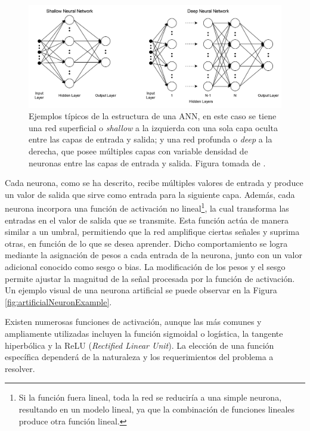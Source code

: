 \begin{figure}[h]
    \centering
    \includegraphics[width=\linewidth]{figures/2_theory/neuralNetDiagram.png}
    \caption[Ejemplos de la estructura de una ANN]{Ejemplos típicos de la estructura de una ANN, en este caso se tiene una red superficial o \textit{shallow} a la izquierda con una sola capa oculta entre las capas de entrada y salida; y una red profunda o \textit{deep} a la derecha, que posee múltiples capas con variable densidad de neuronas entre las capas de entrada y salida. Figura tomada de \cite{annPictureSource}.}
    \label{fig:annExample}
\end{figure}

Cada neurona, como se ha descrito, recibe múltiples valores de entrada y produce un valor de salida que sirve como entrada para la siguiente capa. Además, cada neurona incorpora una función de activación no lineal\footnote{Si la función fuera lineal, toda la red se reduciría a una simple neurona, resultando en un modelo lineal, ya que la combinación de funciones lineales produce otra función lineal.}, la cual transforma las entradas en el valor de salida que se transmite. Esta función actúa de manera similar a un umbral, permitiendo que la red amplifique ciertas señales y suprima otras, en función de lo que se desea aprender. Dicho comportamiento se logra mediante la asignación de pesos a cada entrada de la neurona, junto con un valor adicional conocido como sesgo o bias. La modificación de los pesos y el sesgo permite ajustar la magnitud de la señal procesada por la función de activación. Un ejemplo visual de una neurona artificial se puede observar en la Figura \ref{fig:artificialNeuronExample}.

Existen numerosas funciones de activación, aunque las más comunes y ampliamente utilizadas incluyen la función sigmoidal o logística, la tangente hiperbólica y la ReLU (\textit{Rectified Linear Unit}). La elección de una función específica dependerá de la naturaleza y los requerimientos del problema a resolver.


